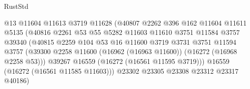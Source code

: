 \begin{lexlean}{RustStd}
\begin{coremodule}
                                        @13
                                        @11604
                                        @11613
                                        @3719
                                        @11628
                                        (@40807
                                          @2262
                                          @396
                                          @162
                                          @11604
                                          @11611
                                          @5135
                                          (@40816
                                            @2261
                                            @53
                                            @55
                                            @5282
                                            @11603
                                            @11610
                                            @3751
                                            @11584
                                            @3757
                                            @39340
                                            (@40815
                                              @2259
                                              @104
                                              @53
                                              @16
                                              @11600
                                              @3719
                                              @3731
                                              @3751
                                              @11594
                                              @3757
                                              (@39300
                                                @2258
                                                @11600
                                                (@16962 (@16963 @11600))
                                                (@16272 (@16968 @2258 @53)))
                                              @39267
                                              @16559
                                              (@16272 (@16561 @11595 @3719)))
                                            @16559
                                            (@16272 (@16561 @11585 @11603)))
                                          @23302
                                          @23305
                                          @23308
                                          @23312
                                          @23317
                                          @40186)

\end{coremodule}
\end{lexlean}
